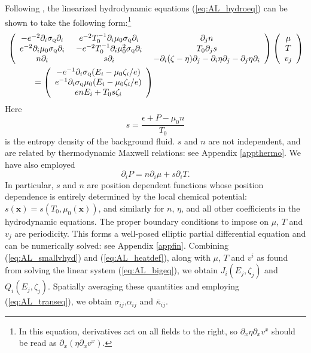 Following \cite{lucas_hydrodynamic_2015}, the linearized hydrodynamic equations (\ref{eq:AL_hydroeq}) can be shown to take the following form:\footnote{In this equation, derivatives act on all fields to the right, so $\partial_x \eta \partial_x v^x$ should be read as $\partial_x (\eta \partial_x v^x)$.} \begin{align}
 &\left(\begin{array}{ccc} - e^{-2}\partial_i \sigma_{\textsc{q}} \partial_i  &\  e^{-2}T_0^{-1} \partial_i \mu_0\sigma_{\textsc{q}} \partial_i  &\ \partial_j n   \\ e^{-2} \partial_i \mu_0\sigma_{\textsc{q}} \partial_i  &\ -e^{-2} T^{-1}_0\partial_i \mu_0^2\sigma_{\textsc{q}} \partial_i  &\ T_0\partial_j s  \\ n\partial_i   &\ s\partial_i  &\  - \partial_i (\zeta-\eta)\partial_j  - \partial_i \eta \partial_j - \partial_j \eta \partial_i  \end{array}\right)  \left(\begin{array}{c} \mu \\ T \\ v_j\end{array}\right) \notag \\
&\;\;\;\;\;\;\;\;\;\;\;  = \left(\begin{array}{c} -e^{-1}\partial_i \sigma_{\textsc{q}} (E_i - \mu_0 \zeta_i/e) \\ e^{-1} \partial_i \sigma_{\textsc{q}}  \mu_0 (E_i - \mu_0 \zeta_i/e) \\ en E_i + T_0 s\zeta_i \end{array}\right)  \label{eq:AL_bigeq}
\end{align}
Here \begin{equation}
s = \frac{\epsilon+P - \mu_0 n}{T_0}
\end{equation}is the entropy density of the background fluid.   $s$ and $n$ are not independent, and are related by thermodynamic Maxwell relations:  see Appendix \ref{appthermo}.   We have also employed \begin{equation}
\partial_i P =  n \partial_i \mu + s\partial_i T. 
\end{equation}
In particular, $s$ and $n$ are position dependent functions whose position dependence is entirely determined by the local chemical potential:  $s(\mathbf{x}) = s(T_0,\mu_0(\mathbf{x}))$, and similarly for $n$, $\eta$, and all other coefficients in the hydrodynamic equations.   The proper boundary conditions to impose on $\mu$, $T$ and $v_j$ are periodicity.   This forms a well-posed elliptic partial differential equation and can be numerically solved: see Appendix \ref{appfin}.   Combining (\ref{eq:AL_smallvhyd}) and (\ref{eq:AL_heatdef}), along with $\mu$, $T$ and $v^i$ as found from solving the linear system (\ref{eq:AL_bigeq}), we obtain $J_i(E_j,\zeta_j)$ and $Q_i(E_j,\zeta_j)$.  Spatially averaging these quantities and employing (\ref{eq:AL_transeq}), we obtain $\sigma_{ij}$,$\alpha_{ij}$ and $\bar\kappa_{ij}$. 

